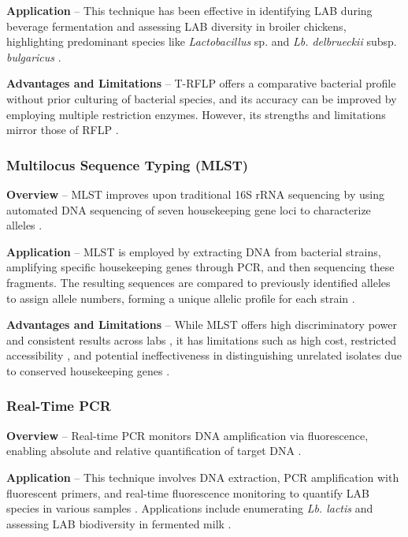 \textbf{Application} – This technique has been effective in identifying LAB during beverage fermentation and assessing LAB diversity in broiler chickens, highlighting predominant species like \textit{Lactobacillus} sp. and \textit{Lb. delbrueckii} subsp. \textit{bulgaricus} \cite*{L4-MolTyping}.

\textbf{Advantages and Limitations} – T-RFLP offers a comparative bacterial profile without prior culturing of bacterial species, and its accuracy can be improved by employing multiple restriction enzymes. However, its strengths and limitations mirror those of RFLP \cite*{L4-MolTyping}.

\subsubsection{Multilocus Sequence Typing (MLST)}
\textbf{Overview} – MLST improves upon traditional 16S rRNA sequencing by using automated DNA sequencing of seven housekeeping gene loci to characterize alleles \cite*{L4-MolTyping}.

\textbf{Application} – MLST is employed by extracting DNA from bacterial strains, amplifying specific housekeeping genes through PCR, and then sequencing these fragments. The resulting sequences are compared to previously identified alleles to assign allele numbers, forming a unique allelic profile for each strain \cite*{L4-MolTyping}.

\textbf{Advantages and Limitations} – While MLST offers high discriminatory power and consistent results across labs \cite*{L4-MolTyping}, it has limitations such as high cost, restricted accessibility \cite*{L4-MolTyping}, and potential ineffectiveness in distinguishing unrelated isolates due to conserved housekeeping genes \cite*{L4-MolTyping}.

\subsubsection{Real-Time PCR}
\textbf{Overview} – Real-time PCR monitors DNA amplification via fluorescence, enabling absolute and relative quantification of target DNA \cite*{L4-MolTyping}.

\textbf{Application} – This technique involves DNA extraction, PCR amplification with fluorescent primers, and real-time fluorescence monitoring to quantify LAB species in various samples \cite*{L4-MolTyping}. Applications include enumerating \textit{Lb. lactis} and assessing LAB biodiversity in fermented milk \cite*{L4-MolTyping}.


